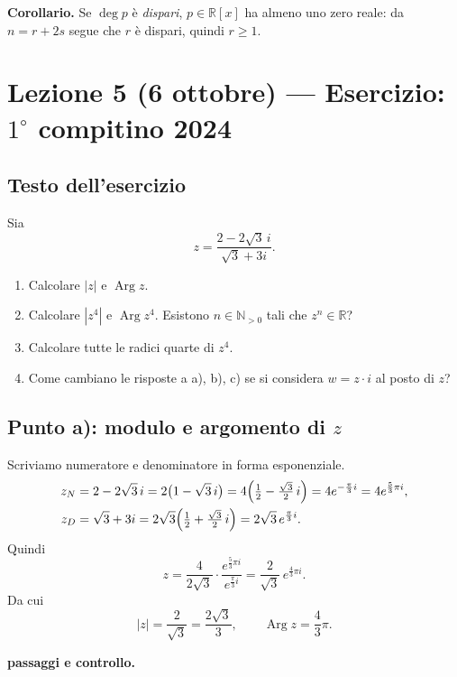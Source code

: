 \documentclass[11pt,a4paper]{article}
\newcommand{\RR}{\mathbb{R}}
\newcommand{\NN}{\mathbb{N}}
\newcommand{\Arg}{\operatorname{Arg}}
\theoremstyle{plain}
\theoremstyle{definition}
\theoremstyle{remark}
\begin{document}
\smallskip
\textbf{Corollario.} Se $\deg p$ è \emph{dispari}, $p\in\RR[x]$ ha almeno uno zero reale: da $n=r+2s$ segue che $r$ è dispari, quindi $r\ge1$.
\par\medskip

\section{Lezione 5 (6 ottobre) --- Esercizio: $1^\circ$ compitino 2024}

\subsection{Testo dell'esercizio}
Sia
\[
  z=\frac{2-2\sqrt3\,i}{\sqrt3+3i}.
\]
\begin{enumerate}[label=\alph*)]
  \item Calcolare $|z|$ e $\Arg z$.
  \item Calcolare $|z^4|$ e $\Arg z^4$. Esistono $n\in\NN_{>0}$ tali che $z^n\in\RR$?
  \item Calcolare tutte le radici quarte di $z^4$.
  \item Come cambiano le risposte a a), b), c) se si considera $w=z\cdot i$ al posto di $z$?
\end{enumerate}

\subsection{Punto a): modulo e argomento di $z$}

Scriviamo numeratore e denominatore in forma esponenziale.
\begin{align*}
  z_N&=2-2\sqrt3\,i=2\bigl(1-\sqrt3\,i\bigr)=4\Bigl(\tfrac12-\tfrac{\sqrt3}2\,i\Bigr)=4e^{-\frac\pi3 i}=4e^{\frac53\pi i},\\
  z_D&=\sqrt3+3i=2\sqrt3\Bigl(\tfrac12+\tfrac{\sqrt3}2\,i\Bigr)=2\sqrt3\,e^{\frac\pi3 i}.
\end{align*}
Quindi
\[
  z=\frac{4}{2\sqrt3}\cdot\frac{e^{\frac53\pi i}}{e^{\frac\pi3 i}}=\frac2{\sqrt3}\,e^{\frac43\pi i}.
\]
Da cui
\[
  \boxed{|z|=\frac2{\sqrt3}=\frac{2\sqrt3}3,\qquad\Arg z=\frac43\pi.}
\]

\par\medskip
\noindent\textbf{passaggi e controllo.}\par
\end{document}
